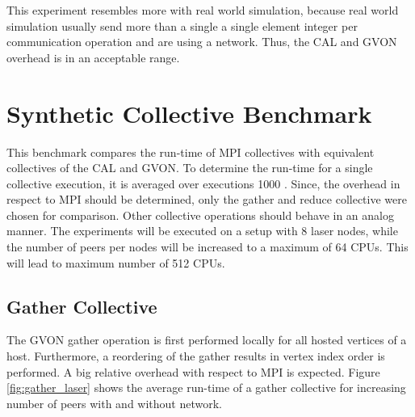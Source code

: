 \noindent This experiment resembles more with real world simulation,
because real world simulation usually send more than a single a single
element integer per communication operation and are using a
network. Thus, the CAL and GVON overhead is in an acceptable
range.


\section{Synthetic Collective Benchmark}
This benchmark compares the run-time of MPI collectives with
equivalent collectives of the CAL and GVON.  To determine the run-time
for a single collective execution, it is averaged over executions 1000
.  Since, the overhead in respect to MPI should be determined, only
the gather and reduce collective were chosen for comparison. Other
collective operations should behave in an analog manner. The
experiments will be executed on a setup with 8 laser nodes, while the
number of peers per nodes will be increased to a maximum of 64 CPUs.
This will lead to maximum number of 512 CPUs.


\subsection*{Gather Collective}
The GVON gather operation is first performed locally for all hosted
vertices of a host. Furthermore, a reordering of the gather results in
vertex index order is performed. A big relative overhead with respect
to MPI is expected.  Figure \ref{fig:gather_laser} shows the average
run-time of a gather collective for increasing number of peers with
and without network.

